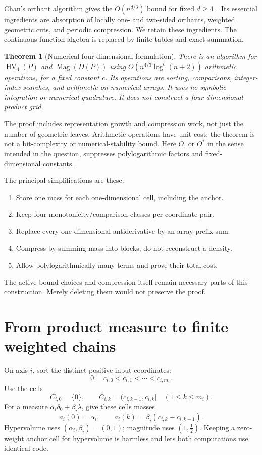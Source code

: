 \documentclass[12pt,a4paper]{article}
\newtheorem{theorem}{Theorem}
\theoremstyle{remark}
\newcommand{\HV}{\operatorname{HV}}
\newcommand{\Mag}{\operatorname{Mag}}
\newcommand{\1}{\mathbf1}
\newcommand{\wtO}{\widetilde O}
\begin{document}
Chan's orthant algorithm gives the $\wtO(n^{d/3})$ bound for fixed
$d\ge4$~\cite{chan}. Its essential ingredients are absorption of locally
one- and two-sided orthants, weighted geometric cuts, and periodic
compression. We retain these ingredients. The continuous function algebra
is replaced by finite tables and exact summation.

\begin{theorem}[Numerical four-dimensional formulation]\label{thm:main}
There is an algorithm for $\HV_4(P)$ and $\Mag(D(P))$ using
$O(n^{4/3}\log^c(n+2))$ arithmetic operations, for a fixed constant $c$.
Its operations are sorting, comparisons, integer-index searches, and
arithmetic on numerical arrays. It uses no symbolic integration or
numerical quadrature. It does not construct a four-dimensional product grid.
\end{theorem}

The proof includes representation growth and compression work, not just
the number of geometric leaves. Arithmetic operations have unit cost;
the theorem is not a bit-complexity or numerical-stability bound.
Here $\wtO$, or $O^*$ in the sense intended in the question, suppresses
polylogarithmic factors and fixed-dimensional constants.

The principal simplifications are these:
\begin{enumerate}
\item Store one mass for each one-dimensional cell, including the anchor.
\item Keep four monotonicity/comparison classes per coordinate pair.
\item Replace every one-dimensional antiderivative by an array prefix sum.
\item Compress by summing mass into blocks; do not reconstruct a density.
\item Allow polylogarithmically many terms and prove their total cost.
\end{enumerate}
The active-bound choices and compression itself remain necessary parts
of this construction. Merely deleting them would not preserve the proof.

\section{From product measure to finite weighted chains}\label{sec:cells}
On axis $i$, sort the distinct positive input coordinates:
\[
             0=c_{i,0}<c_{i,1}<\cdots<c_{i,m_i}.
\]
Use the cells
\[
 C_{i,0}=\{0\},\qquad
 C_{i,k}=(c_{i,k-1},c_{i,k}]\quad(1\le k\le m_i).
\]
For a measure $\alpha_i\delta_0+\beta_i\lambda$, give these cells masses
\begin{equation}
 a_i(0)=\alpha_i,\qquad
 a_i(k)=\beta_i(c_{i,k}-c_{i,k-1}).                 \label{eq:cellmass}
\end{equation}
Hypervolume uses $(\alpha_i,\beta_i)=(0,1)$; magnitude uses
$(1,\tfrac12)$. Keeping a zero-weight anchor cell for hypervolume is harmless
and lets both computations use identical code.
\end{document}
